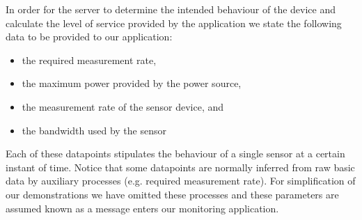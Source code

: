 In order for the server to determine the intended behaviour of the device and calculate the level of service provided by the application we state the following data to be provided to our application:
\begin{itemize}
\nospace
\item the required measurement rate,
\item the maximum power provided by the power source,
\item the measurement rate of the sensor device, and
\item the bandwidth used by the sensor 
\end{itemize}
Each of these datapoints stipulates the behaviour of a single sensor at a certain instant of time. Notice that some datapoints are normally inferred from raw basic data by auxiliary processes (e.g. required measurement rate). For simplification of our demonstrations we have omitted these processes and these parameters are assumed known as a message enters our monitoring application.


